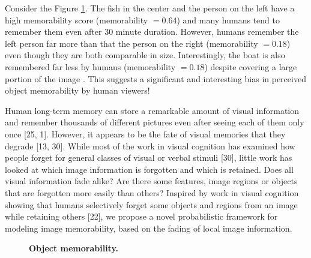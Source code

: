 Consider the Figure \ref{fig:introPhoto}. The fish in the center and the person on the left have a high memorability score (memorability $= 0.64$) and many humans tend to remember them even after $30$ minute duration. However, humans remember the left person far more than that the person on the right (memorability $= 0.18$) even though they are both comparable in size. Interestingly, the boat is also remembered far less by humans (memorability $= 0.18$) despite covering a large portion of the image . This suggests a significant and interesting bias in perceived object memorability by human viewers!

Human long-term memory can store a remarkable amount of visual information and remember thousands of different pictures even after seeing each of them only once [25, 1]. However, it appears to be the fate of visual memories that they degrade [13, 30]. While most of the work in visual cognition has examined how people forget for general classes of visual or verbal stimuli [30], little work has looked at which image information is forgotten and which is retained. Does all visual information fade alike? Are there some features, image regions or objects that are forgotten more easily than others? Inspired by work in visual cognition showing that humans selectively forget some objects and regions from an image while retaining others [22], we propose a novel probabilistic framework for modeling image memorability, based on the fading of local image information.

\begin{figure}[t]
\centering
{}
\vspace{-3mm}\caption{\footnotesize\textbf{Object memorability.}}\label{fig:introPhoto}
\end{figure}

